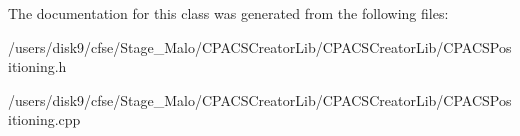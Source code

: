 The documentation for this class was generated from the following files\-:\begin{DoxyCompactItemize}
\item 
/users/disk9/cfse/\-Stage\-\_\-\-Malo/\-C\-P\-A\-C\-S\-Creator\-Lib/\-C\-P\-A\-C\-S\-Creator\-Lib/C\-P\-A\-C\-S\-Positioning.\-h\item 
/users/disk9/cfse/\-Stage\-\_\-\-Malo/\-C\-P\-A\-C\-S\-Creator\-Lib/\-C\-P\-A\-C\-S\-Creator\-Lib/C\-P\-A\-C\-S\-Positioning.\-cpp\end{DoxyCompactItemize}
